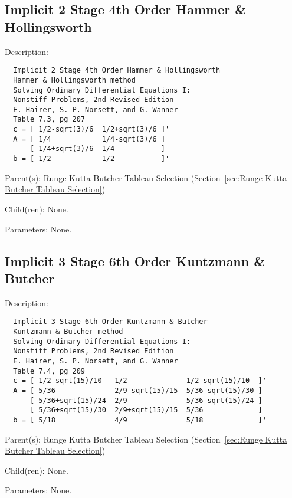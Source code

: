 \subsection{Implicit 2 Stage 4th Order Hammer \& Hollingsworth}
\label{sec:Implicit 2 Stage 4th Order Hammer and Hollingsworth}

\begin{list}{}
  {\setlength{\leftmargin}{1.0in}
   \setlength{\labelwidth}{0.75in}
   \setlength{\labelsep}{0.125in}}
  \item[Description:]
\begin{verbatim}
  Implicit 2 Stage 4th Order Hammer & Hollingsworth
  Hammer & Hollingsworth method
  Solving Ordinary Differential Equations I:
  Nonstiff Problems, 2nd Revised Edition
  E. Hairer, S. P. Norsett, and G. Wanner
  Table 7.3, pg 207
  c = [ 1/2-sqrt(3)/6  1/2+sqrt(3)/6 ]'
  A = [ 1/4            1/4-sqrt(3)/6 ]
      [ 1/4+sqrt(3)/6  1/4           ]
  b = [ 1/2            1/2           ]'
\end{verbatim}
  \item[Parent(s):]
    Runge Kutta Butcher Tableau Selection (Section~\ref{sec:Runge Kutta Butcher Tableau Selection})
  \item[Child(ren):]
    None. 
  \item[Parameters:]
    None. 
\end{list}

\subsection{Implicit 3 Stage 6th Order Kuntzmann \& Butcher}
\label{sec:Implicit 3 Stage 6th Order Kuntzmann and Butcher}

\begin{list}{}
  {\setlength{\leftmargin}{1.0in}
   \setlength{\labelwidth}{0.75in}
   \setlength{\labelsep}{0.125in}}
  \item[Description:]
\begin{verbatim}
  Implicit 3 Stage 6th Order Kuntzmann & Butcher
  Kuntzmann & Butcher method
  Solving Ordinary Differential Equations I:
  Nonstiff Problems, 2nd Revised Edition
  E. Hairer, S. P. Norsett, and G. Wanner
  Table 7.4, pg 209
  c = [ 1/2-sqrt(15)/10   1/2              1/2-sqrt(15)/10  ]'
  A = [ 5/36              2/9-sqrt(15)/15  5/36-sqrt(15)/30 ]
      [ 5/36+sqrt(15)/24  2/9              5/36-sqrt(15)/24 ]
      [ 5/36+sqrt(15)/30  2/9+sqrt(15)/15  5/36             ]
  b = [ 5/18              4/9              5/18             ]'
\end{verbatim}
  \item[Parent(s):]
    Runge Kutta Butcher Tableau Selection (Section~\ref{sec:Runge Kutta Butcher Tableau Selection})
  \item[Child(ren):]
    None. 
  \item[Parameters:]
    None. 
\end{list}

